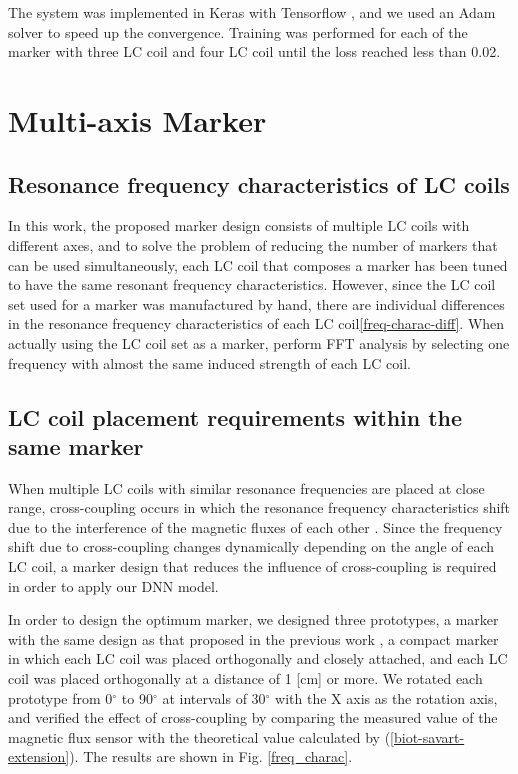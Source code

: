\documentclass[journal,twoside,web]{ieeecolor}
\begin{document}
The system was implemented in Keras \cite{keras} with Tensorflow \cite{tensorflow}, and we used an Adam solver \cite{adam} to speed up the convergence. Training was performed for each of the marker with three LC coil and four LC coil until the loss reached less than 0.02.

\section{Multi-axis Marker}
\label{proposed marker}
\subsection{Resonance frequency characteristics of LC coils}
In this work, the proposed marker design consists of multiple LC coils with different axes, and to solve the problem of reducing the number of markers that can be used simultaneously, each LC coil that composes a marker has been tuned to have the same resonant frequency characteristics. However, since the LC coil set used for a marker was manufactured by hand, there are individual differences in the resonance frequency characteristics of each LC coil\ref{freq-charac-diff}. When actually using the LC coil set as a marker, perform FFT analysis by selecting one frequency with almost the same induced strength of each LC coil.

\subsection{LC coil placement requirements within the same marker}
When multiple LC coils with similar resonance frequencies are placed at close range, cross-coupling occurs in which the resonance frequency characteristics shift due to the interference of the magnetic fluxes of each other \cite {cross-coupling, cross-coupling2}. Since the frequency shift due to cross-coupling changes dynamically depending on the angle of each LC coil, a marker design that reduces the influence of cross-coupling is required in order to apply our DNN model.

In order to design the optimum marker, we designed three prototypes, a marker with the same design as that proposed in the previous work \cite {im6d}, a compact marker in which each LC coil was placed orthogonally and closely attached, and each LC coil was placed orthogonally at a distance of 1 [cm] or more. We rotated each prototype from 0$^\circ$ to 90$^\circ$ at intervals of 30$^\circ$ with the X axis as the rotation axis, and verified the effect of cross-coupling by comparing the measured value of the magnetic flux sensor with the theoretical value calculated by (\ref{biot-savart-extension}).
The results are shown in Fig. \ref{freq_charac}.
\end{document}
